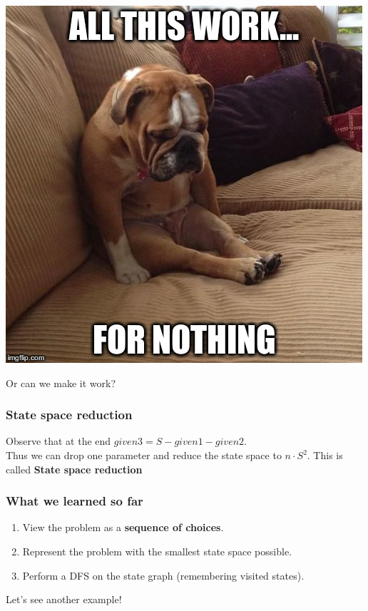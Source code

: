 \documentclass[12pt]{beamer}
\newcommand{\blank}{\vspace{.5cm}}
\begin{document}
\begin{frame}
    \begin{center}
        \includegraphics[scale=.4]{img/sad.jpg}
    \end{center}
    Or can we make it work?
\end{frame}

\begin{frame}
    \frametitle{State space reduction}
    Observe that at the end $ given3 = S - given1 - given2 $. \\\blank
    Thus we can drop one parameter and reduce the state space to $ n \cdot S^2 $.
     \blank
    This is called \textbf{State space reduction}
\end{frame}

\begin{frame}
    \frametitle{What we learned so far}
    \begin{enumerate}
        \item View the problem as a \textbf{sequence of choices}. \blank
        \item Represent the problem with the smallest state space possible. \blank
        \item Perform a DFS on the state graph (remembering visited states). 
    \end{enumerate}
    \pause \blank
    Let's see another example!
\end{frame}
\end{document}
